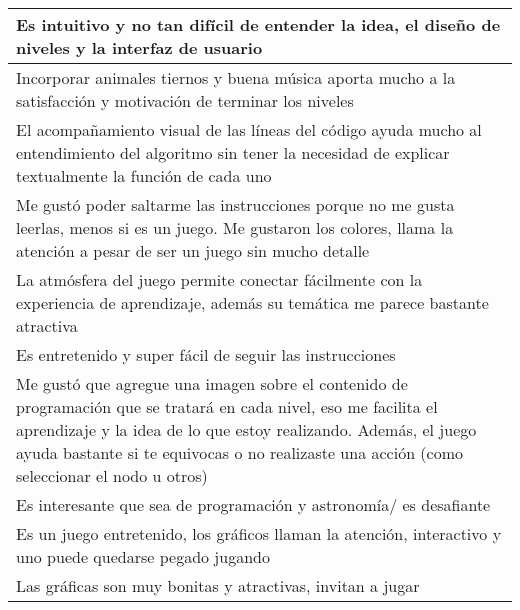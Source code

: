 \begin{table}[h]
\begin{tabular}{|p{\linewidth}|}
   Es intuitivo y no tan difícil de entender la idea, el diseño de niveles y la interfaz de usuario \\\hline
   Incorporar animales tiernos y buena música aporta mucho a la satisfacción y motivación de terminar los niveles \\\hline
   El acompañamiento visual de las líneas del código ayuda mucho al entendimiento del algoritmo sin tener la necesidad de explicar textualmente la función de cada uno \\\hline
 Me gustó poder saltarme las instrucciones porque no me gusta leerlas, menos si es un juego. Me gustaron los colores, llama la atención a pesar de ser un juego sin mucho detalle \\\hline
    La atmósfera del juego permite conectar fácilmente con la experiencia de aprendizaje, además su temática me parece bastante atractiva \\\hline
    Es entretenido y super fácil de seguir las instrucciones \\\hline
    Me gustó que agregue una imagen sobre el contenido de programación que se tratará en cada nivel, eso me facilita el aprendizaje y la idea de lo que estoy realizando. Además, el juego ayuda bastante si te equivocas o no realizaste una acción (como seleccionar el nodo u otros) \\\hline
    Es interesante que sea de programación y astronomía/ es desafiante \\\hline
    Es un juego entretenido, los gráficos llaman la atención, interactivo y uno puede quedarse pegado jugando \\\hline
    Las gráficas son muy bonitas y atractivas, invitan a jugar  \\
   \hline
   \end{tabular}
\end{table}

\restoregeometry


